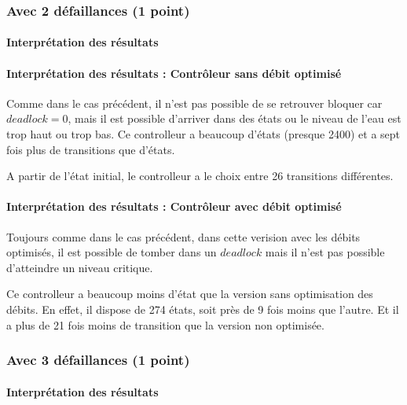 \documentclass[a4paper]{book}
\begin{document}
\subsubsection{Avec 2 défaillances (1 point)}


%
%
%
\paragraph{Interprétation des résultats}
\paragraph{Interprétation des résultats : Contrôleur sans débit optimisé}
Comme dans le cas précédent, il n'est pas possible de se retrouver bloquer car $deadlock=0$, mais il est possible d'arriver dans des états ou le niveau de l'eau est trop haut ou trop bas.
Ce controlleur a beaucoup d'états (presque 2400) et a sept fois plus de transitions que d'états.

A partir de l'état initial, le controlleur a le choix entre 26 transitions différentes.
\paragraph{Interprétation des résultats : Contrôleur avec débit optimisé}
Toujours comme dans le cas précédent, dans cette verision avec les débits optimisés, il est possible de tomber dans un $deadlock$ mais il n'est pas possible d'atteindre un niveau critique.

Ce controlleur a beaucoup moins d'état que la version sans optimisation des débits. En effet, il dispose de 274 états, soit près de 9 fois moins que l'autre.
Et il a plus de 21 fois moins de transition que la version non optimisée.


\subsubsection{Avec 3 défaillances (1 point)}


%
%
%
\paragraph{Interprétation des résultats}
\end{document}
